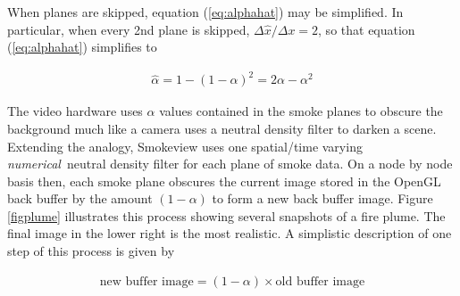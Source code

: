 When planes are skipped, equation (\ref{eq:alphahat}) may be simplified.  In particular, when every 2nd plane is skipped, $\Delta\hat{x}/\Delta x=2$, so that equation (\ref{eq:alphahat})
simplifies to

\begin{eqnarray*}
\hat{\alpha}=1-(1-\alpha)^2=2\alpha-\alpha^2
\end{eqnarray*}

The video hardware uses $\alpha$ values contained in the smoke planes to obscure the background much like a camera uses a neutral density filter to darken a scene.  Extending the analogy, Smokeview uses one spatial/time varying {\em numerical}\ neutral density filter for each plane of smoke data.  On a node by node basis then, each smoke plane obscures the current image stored in  the OpenGL back buffer by the amount $(1-\alpha)$ to form a new back buffer image.  Figure \ref{figplume} illustrates this process showing several snapshots of a fire plume. The final image in the lower right is the most realistic. A simplistic description of one step of this process is given by

\begin{eqnarray*}
\mbox{new buffer image} = (1-\alpha)\times \mbox{old buffer image}
\end{eqnarray*}


